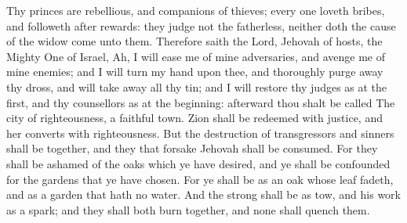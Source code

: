 Thy princes are rebellious, and companions of thieves; every one loveth bribes, and followeth after rewards: they judge not the fatherless, neither doth the cause of the widow come unto them.  Therefore saith the Lord, Jehovah of hosts, the Mighty One of Israel, Ah, I will ease me of mine adversaries, and avenge me of mine enemies; and I will turn my hand upon thee, and thoroughly purge away thy dross, and will take away all thy tin; and I will restore thy judges as at the first, and thy counsellors as at the beginning: afterward thou shalt be called The city of righteousness, a faithful town. Zion shall be redeemed with justice, and her converts with righteousness. But the destruction of transgressors and sinners shall be together, and they that forsake Jehovah shall be consumed. For they shall be ashamed of the oaks which ye have desired, and ye shall be confounded for the gardens that ye have chosen. For ye shall be as an oak whose leaf fadeth, and as a garden that hath no water. And the strong shall be as tow, and his work as a spark; and they shall both burn together, and none shall quench them. 

